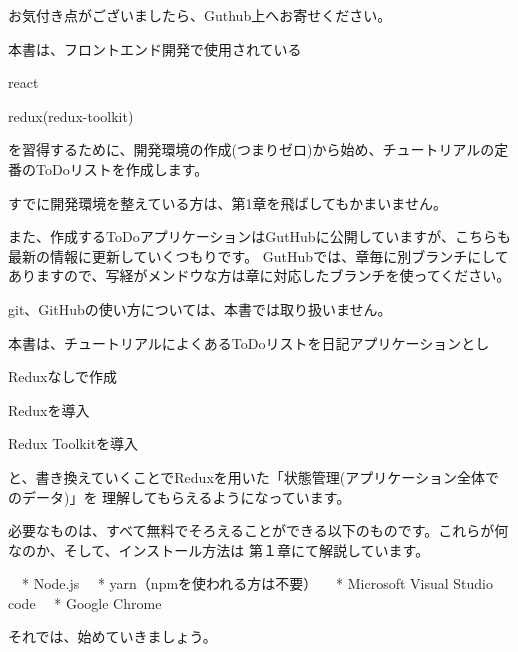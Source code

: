 \vspace*{\baselineskip}

お気付き点がございましたら、Guthub上へお寄せください。

\vspace*{\baselineskip}

本書は、フロントエンド開発で使用されている\\[0pt]

\begin{starteritemize}
\item react
\item redux(redux{-}toolkit)
\end{starteritemize}

を習得するために、開発環境の作成(つまりゼロ)から始め、チュートリアルの定番のToDoリストを作成します。

\vspace*{\baselineskip}

すでに開発環境を整えている方は、第1章を飛ばしてもかまいません。

\vspace*{\baselineskip}

また、作成するToDoアプリケーションはGutHubに公開していますが、こちらも最新の情報に更新していくつもりです。
GutHubでは、章毎に別ブランチにしてありますので、写経がメンドウな方は章に対応したブランチを使ってください。

\vspace*{\baselineskip}

git、GitHubの使い方については、本書では取り扱いません。

\vspace*{\baselineskip}

本書は、チュートリアルによくあるToDoリストを日記アプリケーションとし\\[0pt]

\begin{starterenumerate}
\item Reduxなしで作成
\item Reduxを導入
\item Redux Toolkitを導入
\end{starterenumerate}

と、書き換えていくことでReduxを用いた「状態管理(アプリケーション全体でのデータ)」を
理解してもらえるようになっています。

\vspace*{\baselineskip}

必要なものは、すべて無料でそろえることができる以下のものです。これらが何なのか、そして、インストール方法は
第１章にて解説しています。

　* Node.js
　* yarn（npmを使われる方は不要）
　* Microsoft Visual Studio code
　* Google Chrome

\vspace*{\baselineskip}

それでは、始めていきましょう。
